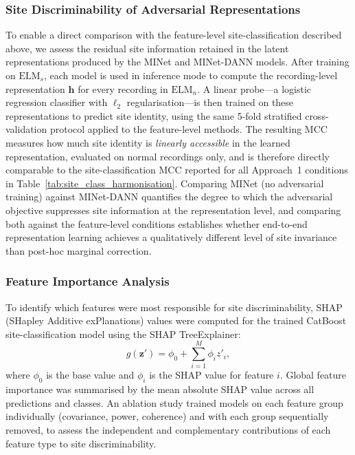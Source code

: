 \documentclass[preprint,12pt]{elsarticle}
\begin{document}
\subsubsection*{Site Discriminability of Adversarial Representations}
\label{subsubsec:dann_site_probe}

To enable a direct comparison with the feature-level site-classification
described above, we assess the residual
site information retained in the latent representations produced by the
MINet and MINet-DANN models.
After training on $\mathrm{ELM}_s$, each model is used in inference mode
to compute the recording-level representation $\mathbf{h}$ for every
recording in $\mathrm{ELM}_n$.
A linear probe---a logistic regression classifier with $\ell_2$
regularisation---is then trained on these representations to predict
site identity, using the same 5-fold stratified cross-validation
protocol applied to the feature-level methods.
The resulting MCC measures how much site identity is \emph{linearly
accessible} in the learned representation, evaluated on normal
recordings only, and is therefore directly comparable to the
site-classification MCC reported for all Approach~1 conditions in
Table~\ref{tab:site_class_harmonisation}.
Comparing MINet (no adversarial training) against MINet-DANN quantifies
the degree to which the adversarial objective suppresses site information
at the representation level, and comparing both against the
feature-level conditions establishes whether end-to-end representation
learning achieves a qualitatively different level of site invariance
than post-hoc marginal correction.

\subsubsection{Feature Importance Analysis}
\label{subsubsec:shap}

To identify which features were most responsible for site
discriminability, SHAP (SHapley Additive exPlanations) values were
computed for the trained CatBoost site-classification model using
the SHAP TreeExplainer:
\begin{equation}
  g(\mathbf{z}') = \phi_0 + \sum_{i=1}^{M} \phi_i z'_i,
  \label{eq:shap}
\end{equation}
where $\phi_0$ is the base value and $\phi_i$ is the SHAP value for
feature $i$.
Global feature importance was summarised by the mean absolute SHAP
value across all predictions and classes.
An ablation study trained models on each feature group individually
(covariance, power, coherence) and with each group sequentially
removed, to assess the independent and complementary contributions of
each feature type to site discriminability.
\end{document}
